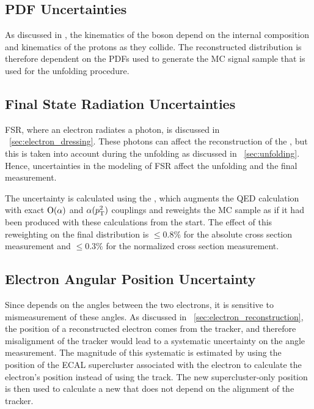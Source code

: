 \subsection{PDF Uncertainties}

As discussed in , the kinematics of
the \Z boson depend on the internal composition and kinematics of the protons
as they collide. The reconstructed \phistar distribution is therefore dependent
on the PDFs used to generate the MC signal sample that is used for the
unfolding procedure.


\subsection{Final State Radiation Uncertainties}

FSR, where an electron radiates a photon, is discussed in
\SEC~\ref{sec:electron_dressing}. These photons can affect the reconstruction
of the \Z, but this is taken into account during the unfolding as discussed in
\SEC~\ref{sec:unfolding}. Hence, uncertainties in the modeling of FSR affect
the unfolding and the final measurement.

The uncertainty is calculated using the \FSRWeightProducer, which augments the
\PYTHIA QED calculation with exact $\operatorname{O}\!\left( \alpha \right)$ and $\alpha(p_{\mathrm{T}}^{2})$
couplings and reweights the MC sample as if it had been produced with these
calculations from the start. The effect of this reweighting on the final
\phistar distribution is $\le 0.8\%$ for the absolute cross section measurement
and $\le 0.3\%$ for the normalized cross section measurement.

\subsection{Electron Angular Position Uncertainty}


Since \phistar depends on the angles between the two electrons, it is sensitive
to mismeasurement of these angles. As discussed in
\SEC~\ref{sec:electron_reconstruction}, the position of a reconstructed
electron comes from the tracker, and therefore misalignment of the tracker
would lead to a systematic uncertainty on the angle measurement. The magnitude
of this systematic is estimated by using the position of the ECAL supercluster
associated with the electron to calculate the electron's position instead of
using the track. The new supercluster-only position is then used to calculate a
new \phistarSC that does not depend on the alignment of the tracker.

